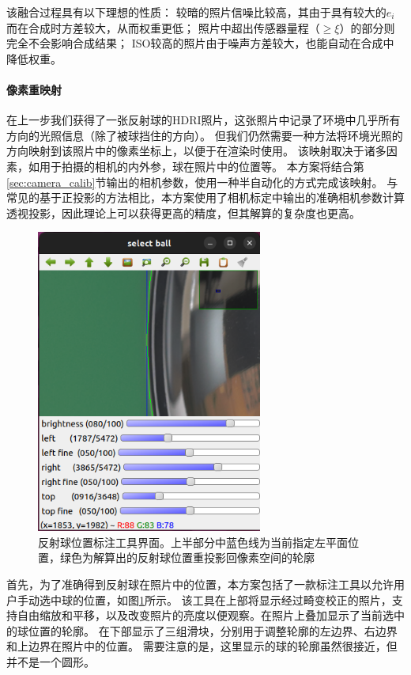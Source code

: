 该融合过程具有以下理想的性质：
较暗的照片信噪比较高，其由于具有较大的$e_i$而在合成时方差较大，从而权重更低；
照片中超出传感器量程（$\geq\xi$）的部分则完全不会影响合成结果；
ISO较高的照片由于噪声方差较大，也能自动在合成中降低权重。

\paragraph{像素重映射}
在上一步我们获得了一张反射球的HDRI照片，这张照片中记录了环境中几乎所有方向的光照信息（除了被球挡住的方向）。
但我们仍然需要一种方法将环境光照的方向映射到该照片中的像素坐标上，以便于在渲染时使用。
该映射取决于诸多因素，如用于拍摄的相机的内外参，球在照片中的位置等。
本方案将结合第\ref{sec:camera_calib}节输出的相机参数，使用一种半自动化的方式完成该映射。
与常见的基于正投影的方法相比，本方案使用了相机标定中输出的准确相机参数计算透视投影，因此理论上可以获得更高的精度，但其解算的复杂度也更高。

\begin{figure}
\centering
\includegraphics[height=10cm]{figures/sphere_locator}
\caption[反射球位置标注工具界面]{反射球位置标注工具界面。上半部分中蓝色线为当前指定左平面位置，绿色为解算出的反射球位置重投影回像素空间的轮廓}
\label{fig:sphere_locator}
\end{figure}
首先，为了准确得到反射球在照片中的位置，本方案包括了一款标注工具以允许用户手动选中球的位置，如图\ref{fig:sphere_locator}所示。
该工具在上部将显示经过畸变校正的照片，支持自由缩放和平移，以及改变照片的亮度以便观察。在照片上叠加显示了当前选中的球位置的轮廓。
在下部显示了三组滑块，分别用于调整轮廓的左边界、右边界和上边界在照片中的位置。
需要注意的是，这里显示的球的轮廓虽然很接近，但并不是一个圆形。

